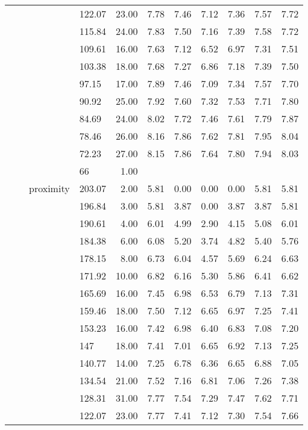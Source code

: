 \begin{longtable}{llllrrrrrrr}
   &  &  & 122.07 & 23.00 & 7.78 & 7.46 & 7.12 & 7.36 & 7.57 & 7.72 \\ 
   &  &  & 115.84 & 24.00 & 7.83 & 7.50 & 7.16 & 7.39 & 7.58 & 7.72 \\ 
   &  &  & 109.61 & 16.00 & 7.63 & 7.12 & 6.52 & 6.97 & 7.31 & 7.51 \\ 
   &  &  & 103.38 & 18.00 & 7.68 & 7.27 & 6.86 & 7.18 & 7.39 & 7.50 \\ 
   &  &  & 97.15 & 17.00 & 7.89 & 7.46 & 7.09 & 7.34 & 7.57 & 7.70 \\ 
   &  &  & 90.92 & 25.00 & 7.92 & 7.60 & 7.32 & 7.53 & 7.71 & 7.80 \\ 
   &  &  & 84.69 & 24.00 & 8.02 & 7.72 & 7.46 & 7.61 & 7.79 & 7.87 \\ 
   &  &  & 78.46 & 26.00 & 8.16 & 7.86 & 7.62 & 7.81 & 7.95 & 8.04 \\ 
   &  &  & 72.23 & 27.00 & 8.15 & 7.86 & 7.64 & 7.80 & 7.94 & 8.03 \\ 
   &  &  & 66 & 1.00 &  &  &  &  &  &  \\ 
   &  & proximity & 203.07 & 2.00 & 5.81 & 0.00 & 0.00 & 0.00 & 5.81 & 5.81 \\ 
   &  &  & 196.84 & 3.00 & 5.81 & 3.87 & 0.00 & 3.87 & 3.87 & 5.81 \\ 
   &  &  & 190.61 & 4.00 & 6.01 & 4.99 & 2.90 & 4.15 & 5.08 & 6.01 \\ 
   &  &  & 184.38 & 6.00 & 6.08 & 5.20 & 3.74 & 4.82 & 5.40 & 5.76 \\ 
   &  &  & 178.15 & 8.00 & 6.73 & 6.04 & 4.57 & 5.69 & 6.24 & 6.63 \\ 
   &  &  & 171.92 & 10.00 & 6.82 & 6.16 & 5.30 & 5.86 & 6.41 & 6.62 \\ 
   &  &  & 165.69 & 16.00 & 7.45 & 6.98 & 6.53 & 6.79 & 7.13 & 7.31 \\ 
   &  &  & 159.46 & 18.00 & 7.50 & 7.12 & 6.65 & 6.97 & 7.25 & 7.41 \\ 
   &  &  & 153.23 & 16.00 & 7.42 & 6.98 & 6.40 & 6.83 & 7.08 & 7.20 \\ 
   &  &  & 147 & 18.00 & 7.41 & 7.01 & 6.65 & 6.92 & 7.13 & 7.25 \\ 
   &  &  & 140.77 & 14.00 & 7.25 & 6.78 & 6.36 & 6.65 & 6.88 & 7.05 \\ 
   &  &  & 134.54 & 21.00 & 7.52 & 7.16 & 6.81 & 7.06 & 7.26 & 7.38 \\ 
   &  &  & 128.31 & 31.00 & 7.77 & 7.54 & 7.29 & 7.47 & 7.62 & 7.71 \\ 
   &  &  & 122.07 & 23.00 & 7.77 & 7.41 & 7.12 & 7.30 & 7.54 & 7.66 \\ 

\end{longtable}
